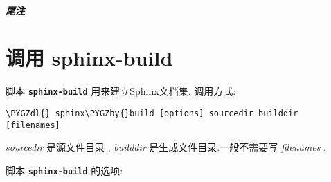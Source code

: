 \documentclass[letterpaper,10pt,english]{sphinxmanual}
\def\PYGZdl{\char`\$}
\def\PYGZhy{\char`\-}
\begin{document}
\paragraph{尾注}


\chapter{调用 sphinx-build}
\label{invocation::doc}\label{invocation:sphinx-build}\label{invocation:invocation}
脚本 \textbf{\texttt{sphinx-build}} 用来建立Sphinx文档集.
调用方式:

\begin{Verbatim}[commandchars=\\\{\}]
\PYGZdl{} sphinx\PYGZhy{}build [options] sourcedir builddir [filenames]
\end{Verbatim}

\emph{sourcedir} 是源文件目录  {\hyperref[glossary:term\string-source\string-directory]{}} , \emph{builddir} 是生成文件目录.一般不需要写 \emph{filenames} .

脚本 \textbf{\texttt{sphinx-build}} 的选项:
\end{document}
